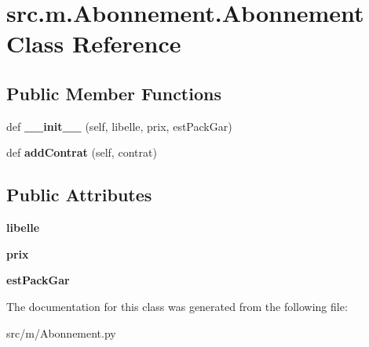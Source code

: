 \hypertarget{classsrc_1_1m_1_1_abonnement_1_1_abonnement}{}\section{src.\+m.\+Abonnement.\+Abonnement Class Reference}
\label{classsrc_1_1m_1_1_abonnement_1_1_abonnement}
\subsection*{Public Member Functions}
\begin{DoxyCompactItemize}
\item 
\hypertarget{classsrc_1_1m_1_1_abonnement_1_1_abonnement_a658d6dfa9cb606d1291364208b67422a}{}def {\bfseries \+\_\+\+\_\+init\+\_\+\+\_\+} (self, libelle, prix, est\+Pack\+Gar)\label{classsrc_1_1m_1_1_abonnement_1_1_abonnement_a658d6dfa9cb606d1291364208b67422a}

\item 
\hypertarget{classsrc_1_1m_1_1_abonnement_1_1_abonnement_ab209a3d75c26f212fa11ba8bc55d8288}{}def {\bfseries add\+Contrat} (self, contrat)\label{classsrc_1_1m_1_1_abonnement_1_1_abonnement_ab209a3d75c26f212fa11ba8bc55d8288}

\end{DoxyCompactItemize}
\subsection*{Public Attributes}
\begin{DoxyCompactItemize}
\item 
\hypertarget{classsrc_1_1m_1_1_abonnement_1_1_abonnement_a91e10ed357369287fc30e44e624faeeb}{}{\bfseries libelle}\label{classsrc_1_1m_1_1_abonnement_1_1_abonnement_a91e10ed357369287fc30e44e624faeeb}

\item 
\hypertarget{classsrc_1_1m_1_1_abonnement_1_1_abonnement_a129b702b74c66ef4deacf330d3639faf}{}{\bfseries prix}\label{classsrc_1_1m_1_1_abonnement_1_1_abonnement_a129b702b74c66ef4deacf330d3639faf}

\item 
\hypertarget{classsrc_1_1m_1_1_abonnement_1_1_abonnement_aad3124c60f8c911325ec3b1cb8c9603f}{}{\bfseries est\+Pack\+Gar}\label{classsrc_1_1m_1_1_abonnement_1_1_abonnement_aad3124c60f8c911325ec3b1cb8c9603f}

\end{DoxyCompactItemize}


The documentation for this class was generated from the following file\+:\begin{DoxyCompactItemize}
\item 
src/m/Abonnement.\+py\end{DoxyCompactItemize}
